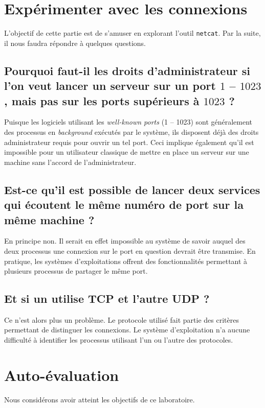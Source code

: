 \documentclass[11pt,a4paper]{article}
\begin{document}
\section{Expérimenter avec les connexions}

L'objectif de cette partie est de s'amuser en explorant l'outil \texttt{netcat}. Par la suite, il nous faudra répondre à quelques questions.

\subsection{Pourquoi faut-il les droits d'administrateur si l'on veut lancer un serveur sur un port $1$ -- $1023$, mais pas sur les ports supérieurs à $1023$ ?}

Puisque les logiciels utilisant les \textit{well-known ports} (1 -- 1023) sont généralement des processus en \textit{background} exécutés par le système, ils disposent déjà des droits administrateur requis pour ouvrir un tel port. Ceci implique également qu'il est impossible pour un utilisateur classique de mettre en place un serveur sur une machine sans l'accord de l'administrateur.

\subsection{Est-ce qu'il est possible de lancer deux services qui écoutent le même numéro de port sur la même machine ?}

En principe non. Il serait en effet impossible au système de savoir auquel des deux processus une connexion sur le port en question devrait être transmise.  En pratique, les systèmes d'exploitations offrent des fonctionnalités permettant à plusieurs processus de partager le même port.



\subsection{Et si un utilise TCP et l'autre UDP ?}

Ce n'est alors plus un problème. Le protocole utilisé fait partie des critères permettant de distinguer les connexions. Le système d'exploitation n'a aucune difficulté à identifier les processus utilisant l'un ou l'autre des protocoles.

\section{Auto-évaluation}

Nous considérons avoir atteint les objectifs de ce laboratoire.
\end{document}
